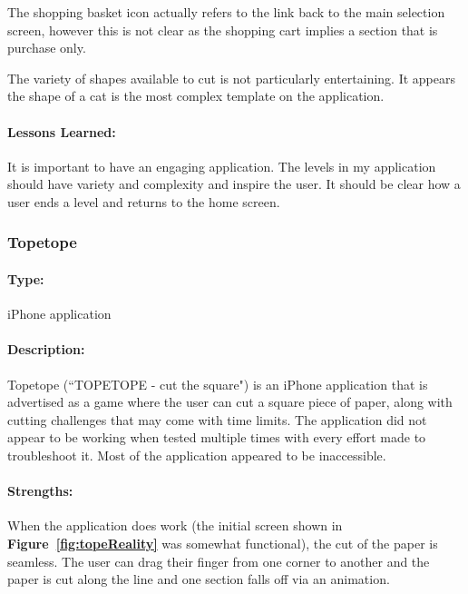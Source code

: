\documentclass[11pt]{article}
\begin{document}
                The shopping basket icon actually refers to the link back to the main selection screen, however this is not clear as the shopping cart implies a section that is purchase only. 
                
                The variety of shapes available to cut is not particularly entertaining. It appears the shape of a cat is the most complex template on the application.
                
                \paragraph{Lessons Learned:}
                
                It is important to have an engaging application. The levels in my application should have variety and complexity and inspire the user. It should be clear how a user ends a level and returns to the home screen.
                
                \subsubsection{Topetope}
                 
                \paragraph{Type:} iPhone application \cite{TopeTope}
                \paragraph{Description:}
                Topetope (``TOPETOPE - cut the square") is an iPhone application that is advertised as a game where the user can cut a square piece of paper, along with cutting challenges that may come with time limits. The application did not appear to be working when tested multiple times with every effort made to troubleshoot it. Most of the application appeared to be inaccessible. 
                
                \paragraph{Strengths:}
                When the application does work (the initial screen shown in \textbf{Figure~\ref{fig:topeReality}} was somewhat functional), the cut of the paper is seamless. The user can drag their finger from one corner to another and the paper is cut along the line and one section falls off via an animation.
                
\end{document}
